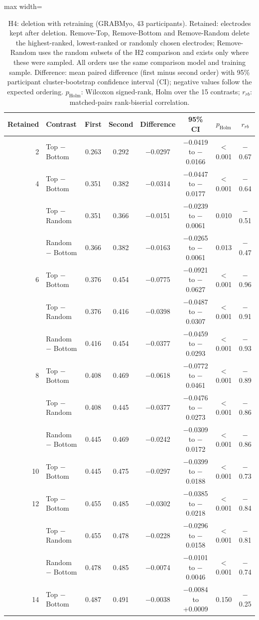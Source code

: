 \begin{table}[htbp]
\centering
\small
\caption{H4: deletion with retraining (GRABMyo, 43 participants). Retained: electrodes kept after deletion. Remove-Top, Remove-Bottom and Remove-Random delete the highest-ranked, lowest-ranked or randomly chosen electrodes; Remove-Random uses the random subsets of the H2 comparison and exists only where these were sampled. All orders use the same comparison model and training sample. Difference: mean paired difference (first minus second order) with 95\% participant cluster-bootstrap confidence interval (CI); negative values follow the expected ordering. $p_{\mathrm{Holm}}$: Wilcoxon signed-rank, Holm over the 15 contrasts; $r_{rb}$: matched-pairs rank-biserial correlation.}
\label{tab:faithfulness}
\setlength{\tabcolsep}{4pt}
\begin{adjustbox}{max width=\textwidth}
\begin{tabular}{rlcccccc}
\toprule
Retained & Contrast & First & Second & Difference & 95\% CI & $p_{\mathrm{Holm}}$ & $r_{rb}$ \\
\midrule
2 & Top $-$ Bottom & 0.263 & 0.292 & $-$0.0297 & $-$0.0419 to $-$0.0166 & $<$0.001 & $-$0.67 \\
\midrule 4 & Top $-$ Bottom & 0.351 & 0.382 & $-$0.0314 & $-$0.0447 to $-$0.0177 & $<$0.001 & $-$0.64 \\
 & Top $-$ Random & 0.351 & 0.366 & $-$0.0151 & $-$0.0239 to $-$0.0061 & 0.010 & $-$0.51 \\
 & Random $-$ Bottom & 0.366 & 0.382 & $-$0.0163 & $-$0.0265 to $-$0.0061 & 0.013 & $-$0.47 \\
\midrule 6 & Top $-$ Bottom & 0.376 & 0.454 & $-$0.0775 & $-$0.0921 to $-$0.0627 & $<$0.001 & $-$0.96 \\
 & Top $-$ Random & 0.376 & 0.416 & $-$0.0398 & $-$0.0487 to $-$0.0307 & $<$0.001 & $-$0.91 \\
 & Random $-$ Bottom & 0.416 & 0.454 & $-$0.0377 & $-$0.0459 to $-$0.0293 & $<$0.001 & $-$0.93 \\
\midrule 8 & Top $-$ Bottom & 0.408 & 0.469 & $-$0.0618 & $-$0.0772 to $-$0.0461 & $<$0.001 & $-$0.89 \\
 & Top $-$ Random & 0.408 & 0.445 & $-$0.0377 & $-$0.0476 to $-$0.0273 & $<$0.001 & $-$0.86 \\
 & Random $-$ Bottom & 0.445 & 0.469 & $-$0.0242 & $-$0.0309 to $-$0.0172 & $<$0.001 & $-$0.86 \\
\midrule 10 & Top $-$ Bottom & 0.445 & 0.475 & $-$0.0297 & $-$0.0399 to $-$0.0188 & $<$0.001 & $-$0.73 \\
\midrule 12 & Top $-$ Bottom & 0.455 & 0.485 & $-$0.0302 & $-$0.0385 to $-$0.0218 & $<$0.001 & $-$0.84 \\
 & Top $-$ Random & 0.455 & 0.478 & $-$0.0228 & $-$0.0296 to $-$0.0158 & $<$0.001 & $-$0.81 \\
 & Random $-$ Bottom & 0.478 & 0.485 & $-$0.0074 & $-$0.0101 to $-$0.0046 & $<$0.001 & $-$0.74 \\
\midrule 14 & Top $-$ Bottom & 0.487 & 0.491 & $-$0.0038 & $-$0.0084 to +0.0009 & 0.150 & $-$0.25 \\
\bottomrule
\end{tabular}
\end{adjustbox}
\end{table}
